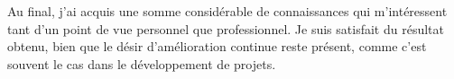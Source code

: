 Au final, j'ai acquis une somme considérable de connaissances qui m'intéressent tant d'un point de vue personnel que professionnel.
Je suis satisfait du résultat obtenu, bien que le désir d'amélioration continue reste présent, comme c'est souvent le cas dans le développement de projets.


\vfil

\hspace{7cm}\begin{minipage}{5cm}
    \printsignature
\end{minipage}\par
\hspace{8cm}\makeatletter\@author\makeatother
\clearpage
